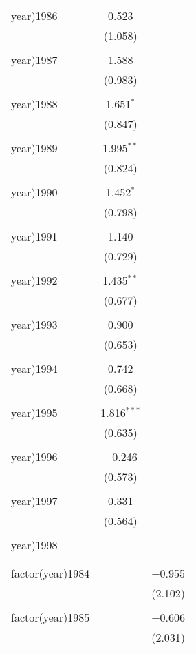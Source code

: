 \begin{table}[!htbp]
\begin{tabular}{@{\extracolsep{5pt}}lcc}
 year)1986 & 0.523 &  \\ 
  & (1.058) &  \\ 
  & & \\ 
 year)1987 & 1.588 &  \\ 
  & (0.983) &  \\ 
  & & \\ 
 year)1988 & 1.651$^{*}$ &  \\ 
  & (0.847) &  \\ 
  & & \\ 
 year)1989 & 1.995$^{**}$ &  \\ 
  & (0.824) &  \\ 
  & & \\ 
 year)1990 & 1.452$^{*}$ &  \\ 
  & (0.798) &  \\ 
  & & \\ 
 year)1991 & 1.140 &  \\ 
  & (0.729) &  \\ 
  & & \\ 
 year)1992 & 1.435$^{**}$ &  \\ 
  & (0.677) &  \\ 
  & & \\ 
 year)1993 & 0.900 &  \\ 
  & (0.653) &  \\ 
  & & \\ 
 year)1994 & 0.742 &  \\ 
  & (0.668) &  \\ 
  & & \\ 
 year)1995 & 1.816$^{***}$ &  \\ 
  & (0.635) &  \\ 
  & & \\ 
 year)1996 & $-$0.246 &  \\ 
  & (0.573) &  \\ 
  & & \\ 
 year)1997 & 0.331 &  \\ 
  & (0.564) &  \\ 
  & & \\ 
 year)1998 &  &  \\ 
  &  &  \\ 
  & & \\ 
 factor(year)1984 &  & $-$0.955 \\ 
  &  & (2.102) \\ 
  & & \\ 
 factor(year)1985 &  & $-$0.606 \\ 
  &  & (2.031) \\ 

\end{tabular}
\end{table}
